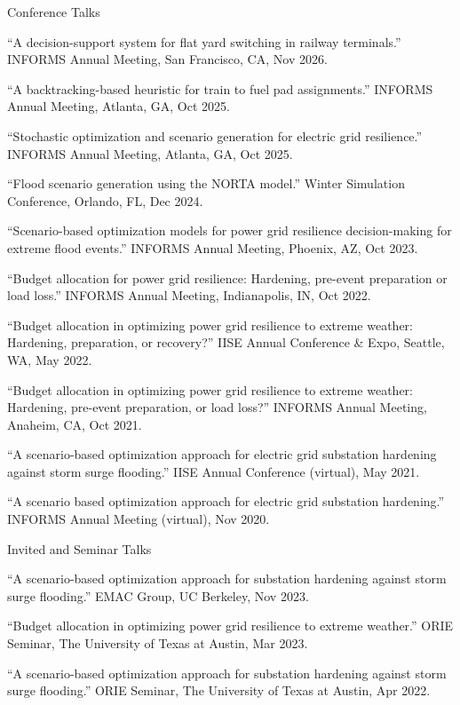 \begin{rSection}{Conference Talks}
\begin{pubs}
    \item ``A decision-support system for flat yard switching in railway terminals.'' INFORMS Annual Meeting, San Francisco, CA, Nov 2026.
    \item ``A backtracking-based heuristic for train to fuel pad assignments.'' INFORMS Annual Meeting, Atlanta, GA, Oct 2025.
    \item ``Stochastic optimization and scenario generation for electric grid resilience.'' INFORMS Annual Meeting, Atlanta, GA, Oct 2025. 
    \item ``Flood scenario generation using the NORTA model.'' Winter Simulation Conference, Orlando, FL, Dec 2024.
    \item ``Scenario-based optimization models for power grid resilience decision-making for extreme flood events.'' INFORMS Annual Meeting, Phoenix, AZ, Oct 2023.
    \item ``Budget allocation for power grid resilience: Hardening, pre-event preparation or load loss.'' INFORMS Annual Meeting, Indianapolis, IN, Oct 2022.
    \item ``Budget allocation in optimizing power grid resilience to extreme weather: Hardening, preparation, or recovery?'' IISE Annual Conference \& Expo, Seattle, WA, May 2022.
    \item ``Budget allocation in optimizing power grid resilience to extreme weather: Hardening, pre-event preparation, or load loss?'' INFORMS Annual Meeting, Anaheim, CA, Oct 2021.
    \item ``A scenario-based optimization approach for electric grid substation hardening against storm surge flooding.'' IISE Annual Conference (virtual), May 2021.
    \item ``A scenario based optimization approach for electric grid substation hardening.'' INFORMS Annual Meeting (virtual), Nov 2020.
\end{pubs}
\end{rSection}

\begin{rSection}{Invited and Seminar Talks}
\begin{pubs}
    \item ``A scenario-based optimization approach for substation hardening against storm surge flooding.'' EMAC Group, UC Berkeley, Nov 2023.
    \item ``Budget allocation in optimizing power grid resilience to extreme weather.'' ORIE Seminar, The University of Texas at Austin, Mar 2023.
    \item ``A scenario-based optimization approach for substation hardening against storm surge flooding.'' ORIE Seminar, The University of Texas at Austin, Apr 2022.
\end{pubs}
\end{rSection}
